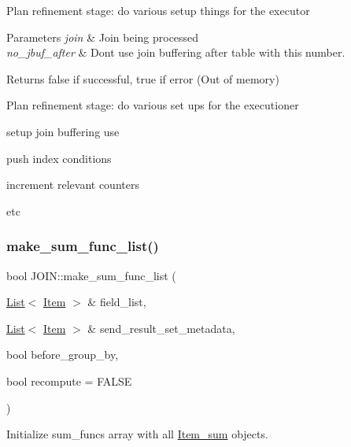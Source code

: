 Plan refinement stage\+: do various setup things for the executor


\begin{DoxyParams}{Parameters}
{\em join} & Join being processed \\
\hline
{\em no\+\_\+jbuf\+\_\+after} & Don\textquotesingle{}t use join buffering after table with this number.\\
\hline
\end{DoxyParams}
\begin{DoxyReturn}{Returns}
false if successful, true if error (Out of memory)
\end{DoxyReturn}
Plan refinement stage\+: do various set ups for the executioner
\begin{DoxyItemize}
\item setup join buffering use
\item push index conditions
\item increment relevant counters
\item etc 
\end{DoxyItemize}\mbox{\label{group__Query__Optimizer_gae713fbd3faf5b5aefad41408fd11685a}} 
\subsubsection{\texorpdfstring{make\+\_\+sum\+\_\+func\+\_\+list()}{make\_sum\_func\_list()}}
{\footnotesize\ttfamily bool J\+O\+I\+N\+::make\+\_\+sum\+\_\+func\+\_\+list (\begin{DoxyParamCaption}\item[{\mbox{\hyperlink{classList}{List}}$<$ \mbox{\hyperlink{classItem}{Item}} $>$ \&}]{field\+\_\+list,  }\item[{\mbox{\hyperlink{classList}{List}}$<$ \mbox{\hyperlink{classItem}{Item}} $>$ \&}]{send\+\_\+result\+\_\+set\+\_\+metadata,  }\item[{bool}]{before\+\_\+group\+\_\+by,  }\item[{bool}]{recompute = {\ttfamily FALSE} }\end{DoxyParamCaption})}

Initialize \textquotesingle{}sum\+\_\+funcs\textquotesingle{} array with all \mbox{\hyperlink{classItem__sum}{Item\+\_\+sum}} objects.


